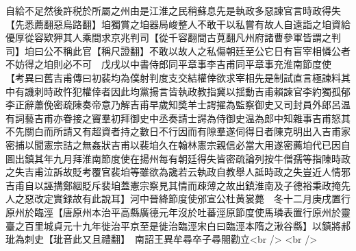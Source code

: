 自給不足然後許税於所屬之州由是江淮之民稍蘇息先是執政多惡諫官言時政得失【先悉薦翻惡烏路翻】垍獨賞之垍器局峻整人不敢干以私嘗有故人自遠詣之垍資給優厚從容欵狎其人乘間求京兆判司【從千容翻間古莧翻凡州府諸曹參軍皆謂之判司】垍曰公不稱此官【稱尺證翻】不敢以故人之私傷朝廷至公它日有盲宰相憐公者不妨得之垍則必不可　戊戌以中書侍郎同平章事李吉甫同平章事充淮南節度使　【考異曰舊吉甫傳曰初裴均為僕射判度支交結權倖欲求宰相先是制試直言極諫料其中有譏刺時政忤犯權倖者因此均黨揚言皆執政教指冀以揺動吉甫賴諫官李約獨孤郁李正辭蕭俛密疏陳奏帝意乃解吉甫早歲知奬羊士諤擢為監察御史又司封員外郎呂温有詞藝吉甫亦眷接之竇羣初拜御史中丞奏請士諤為侍御史温為郎中知雜事吉甫怒其不先關白而所請又有超資者持之數日不行因而有隙羣遂伺得日者陳克明出入吉甫家密捕以聞憲宗詰之無姦狀吉甫以裴垍久在翰林憲宗親信必當大用遂密薦垍代已因自圖出鎮其年九月拜淮南節度使在揚州每有朝廷得失皆密疏論列按牛僧孺等指陳時政之失吉甫泣訴故貶考覆官裴垍等雖欲為讒若云執政自教舉人詆時政之失豈近人情邪吉甫自以誣搆鄭絪貶斥裴垍蓋憲宗察見其情而疎薄之故出鎮淮南及子德裕秉政掩先人之惡改定實録故有此說耳】河中晉絳節度使邠宣公杜黄裳薨　冬十二月庚戌置行原州於臨涇【唐原州本治平高縣廣德元年沒於吐蕃涇原節度使馬璘表置行原州於靈臺之百里城貞元十九年徙治平京至是徙治臨涇宋白曰臨涇本隋之湫谷縣】以鎮將郝玼為刺史【玼音此又且禮翻】　南詔王異牟尋卒子尋閤勸立<br />
<br />
